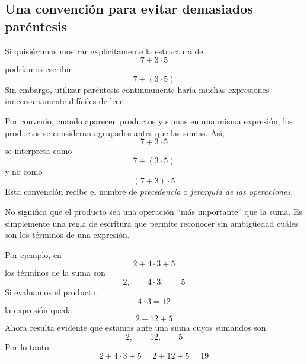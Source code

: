 \subsection{Una convención para evitar demasiados paréntesis}

Si quisiéramos mostrar explícitamente la estructura de
\[
7+3\cdot5
\]
podríamos escribir
\[
7+(3\cdot5)
\]
Sin embargo, utilizar paréntesis continuamente haría muchas expresiones innecesariamente difíciles de leer.

Por convenio, cuando aparecen productos y sumas en una misma expresión, los productos se consideran agrupados antes que las sumas. Así,
\[
7+3\cdot5
\]
se interpreta como
\[
7+(3\cdot5)
\]
y no como
\[
(7+3)\cdot5
\]
Esta convención recibe el nombre de \emph{precedencia} o \emph{jerarquía de las operaciones}.

No significa que el producto sea una operación ``más importante'' que la suma. Es simplemente una regla de escritura que permite reconocer sin ambigüedad cuáles son los términos de una expresión.

Por ejemplo, en
\[
2+4\cdot3+5
\]
los términos de la suma son
\[
2,\qquad4\cdot3,\qquad5
\]
Si evaluamos el producto,
\[
4\cdot3=12
\]
la expresión queda
\[
2+12+5
\]
Ahora resulta evidente que estamos ante una suma cuyos sumandos son
\[
2,\qquad12,\qquad5
\]
Por lo tanto,
\[
2+4\cdot3+5
=
2+12+5
=
19
\]
